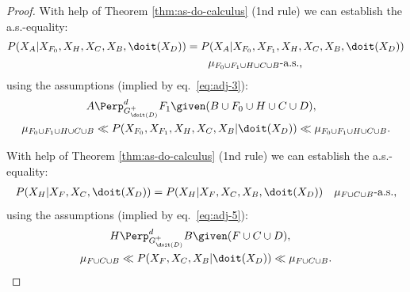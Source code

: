 \begin{Thm}
\begin{proof}
With help of Theorem \ref{thm:as-do-calculus} (1nd rule) we can establish the a.s.-equality:
    \begin{align}
        P(X_A|X_{F_0},X_H,X_C,X_B,\doit(X_D)) &= P(X_A|X_{F_0},X_{F_1},X_H,X_C,X_B,\doit(X_D)) \label{eq:adj-eq-8}\\ 
                           &\qquad \mu_{F_0 \cup F_1 \cup H \cup C \cup B}\text{-a.s.,} \notag 
    \end{align}
using the assumptions (implied by eq.\ \ref{eq:adj-3}):
\begin{align*}
    A & \Perp^d_{G^+_{\doit(D)}} F_1 \given (B \cup F_0 \cup H \cup C \cup D),\\
    \mu_{F_0 \cup F_1 \cup H \cup C \cup B} & \ll P(X_{F_0},X_{F_1},X_H,X_C,X_B|\doit(X_D)) \ll \mu_{F_0\cup F_1  \cup H \cup C \cup B}.
\end{align*}

With help of Theorem \ref{thm:as-do-calculus} (1nd rule) we can establish the a.s.-equality:
    \begin{align}
        P(X_H|X_F,X_C,\doit(X_D)) &= P(X_H|X_F,X_C,X_B,\doit(X_D)) &\mu_{F \cup C \cup B}\text{-a.s.,} \label{eq:adj-eq-9}
    \end{align}
using the assumptions (implied by eq.\ \ref{eq:adj-5}):
\begin{align*}
    H &\Perp^d_{G^+_{\doit(D)}} B \given (F \cup C \cup D),\\
    \mu_{F \cup C \cup B} & \ll P(X_F,X_C,X_B|\doit(X_D)) \ll \mu_{F \cup C \cup B}.
\end{align*}


\end{proof}
\end{Thm}
